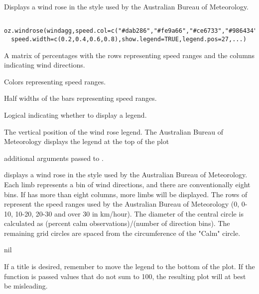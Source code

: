 \begin{Description}\relax
Displays a wind rose in the style used by the Australian
Bureau of Meteorology.
\end{Description}
\begin{Usage}
\begin{verbatim}
 oz.windrose(windagg,speed.col=c("#dab286","#fe9a66","#ce6733","#986434"),
  speed.width=c(0.2,0.4,0.6,0.8),show.legend=TRUE,legend.pos=27,...)
\end{verbatim}
\end{Usage}
\begin{Arguments}
\begin{ldescription}
\item[\code{windagg}] A matrix of percentages with the rows representing
speed ranges and the columns indicating wind directions.
\item[\code{speed.col}] Colors representing speed ranges.
\item[\code{speed.width}] Half widths of the bars representing speed ranges.
\item[\code{show.legend}] Logical indicating whether to display a legend.
\item[\code{legend.pos}] The vertical position of the wind rose legend. The
Australian Bureau of Meteorology displays the legend at the top of
the plot
\item[\code{...}] additional arguments passed to .
\end{ldescription}
\end{Arguments}
\begin{Details}\relax
{} displays a wind rose in the style used by the Australian
Bureau of Meteorology. Each limb represents a bin of wind directions, and 
there are conventionally eight bins. If  has more than eight
columns, more limbs will be displayed. The rows of  represent
the speed ranges used by the Australian Bureau of Meteorology (0, 0-10, 
10-20, 20-30 and over 30 in km/hour). The diameter of the central circle is
calculated as (percent calm observations)/(number of direction bins). The
remaining grid circles are spaced from the circumference of the "Calm"
circle.
\end{Details}
\begin{Value}
nil
\end{Value}
\begin{Note}\relax
If a title is desired, remember to move the legend to the bottom 
of the plot. If the function is passed values that do not sum to 100, the
resulting plot will at best be misleading.
\end{Note}
